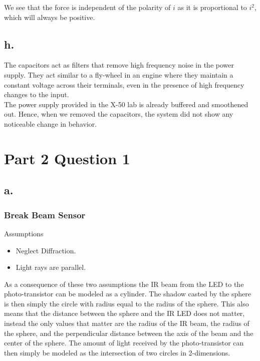 \documentclass{article}
\theoremstyle{plain}
\theoremstyle{definition}
\newtheorem{algorithm}{Algorithm}
\theoremstyle{remark}
\begin{document}
We see that the force is independent of the polarity of $i$ as it is proportional to $i^2$, which will always be positive.


\subsection*{h.}
The capacitors act as filters that remove high frequency noise in the power supply. They act similar to a fly-wheel in an engine where they maintain a constant voltage across their terminals, even in the presence of high frequency changes to the input.\\

The power supply provided in the X-50 lab is already buffered and smoothened out. Hence, when we removed the capacitors, the system did not show any noticeable change in behavior.

\section{Part 2 Question 1}

\subsection*{a.}

\subsubsection{Break Beam Sensor}

Assumptions \\
\begin{itemize}
\item Neglect Diffraction.
\item Light rays are parallel. 
\end{itemize}
As a consequence of these two assumptions the IR beam from the LED to the photo-transistor can be modeled as a cylinder.  The shadow casted by the sphere is then simply the circle with radius equal to the radius of the sphere.  This also means that the distance between the sphere and the IR LED does not matter, instead the only values that matter are the radius of the IR beam, the radius of the sphere, and the perpendicular distance between the axis of the beam and the center of the sphere.  The amount of light received by the photo-transistor can then simply be modeled as the intersection of two circles in 2-dimensions. \\

\end{document}
